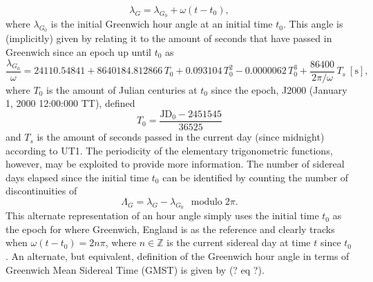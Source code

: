 \documentclass[11pt,dvipsnames]{thesis}
\begin{document}
\begin{equation}
\lambda_G = \lambda_{G_0} + \omega(t - t_0), \label{eq:GMST}%
\end{equation}
where $\lambda_{G_0}$ is the initial Greenwich hour angle at an initial time $t_0$. This angle is (implicitly) given by relating it to the amount of seconds that have passed in Greenwich since an epoch up until $t_0$ as
\begin{equation}
\frac{\lambda_{G_0}}{\omega} = 24110.54841 + 8640184.812866 \,T_0 + 0.093104 \,T_0^2 - 0.0000062 \,T_0^3 + \frac{86400}{2 \pi / \omega}\, T_s \ [\si{\s}],
\end{equation}
where $T_0$ is the amount of Julian centuries at $t_0$ since the epoch, J2000 (January 1, 2000 12:00:000 TT), defined
\begin{equation}
T_0 = \frac{\mathrm{JD}_0 - 2451545}{36525}
\end{equation}
and $T_s$ is the amount of seconds passed in the current day (since midnight) according to UT1. The periodicity of the elementary trigonometric functions, however, may be exploited to provide more information. The number of sidereal days elapsed since the initial time $t_0$ can be identified by counting the number of discontinuities of
\begin{equation}
\Lambda_G = \lambda_G - \lambda_{G_0} \ \ \operatorname{modulo} 2\pi.%
\end{equation}
This alternate representation of an hour angle simply uses the initial time $t_0$ as the epoch for where Greenwich, England is as the reference and clearly tracks when $\omega(t - t_0) = 2n\pi$, where $n \in \mathbb{Z}$ is the current sidereal day at time $t$ since $t_0$. An alternate, but equivalent, definition of the Greenwich hour angle in terms of Greenwich Mean Sidereal Time (GMST) is given by (? eq ?).
\end{document}
